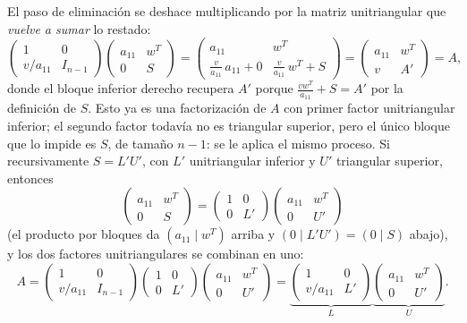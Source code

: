 \documentclass[11pt, a4paper]{article}
\begin{document}
El paso de eliminación se deshace multiplicando por la matriz unitriangular que \emph{vuelve a sumar} lo restado:
\[
\begin{pmatrix} 1 & 0 \\ v / a_{11} & I_{n-1} \end{pmatrix}
\begin{pmatrix} a_{11} & w^T \\ 0 & S \end{pmatrix}
= \begin{pmatrix} a_{11} & w^T \\[2pt] \frac{v}{a_{11}} \, a_{11} + 0 & \frac{v}{a_{11}} \, w^T + S \end{pmatrix}
= \begin{pmatrix} a_{11} & w^T \\ v & A' \end{pmatrix} = A,
\]
donde el bloque inferior derecho recupera $A'$ porque $\frac{v w^T}{a_{11}} + S = A'$ por la definición de $S$. Esto ya es una factorización de $A$ con primer factor unitriangular inferior; el segundo factor todavía no es triangular superior, pero el único bloque que lo impide es $S$, de tamaño $n - 1$: se le aplica el mismo proceso. Si recursivamente $S = L' U'$, con $L'$ unitriangular inferior y $U'$ triangular superior, entonces
\[
\begin{pmatrix} a_{11} & w^T \\ 0 & S \end{pmatrix}
= \begin{pmatrix} 1 & 0 \\ 0 & L' \end{pmatrix}
\begin{pmatrix} a_{11} & w^T \\ 0 & U' \end{pmatrix}
\]
(el producto por bloques da $(a_{11} \mid w^T)$ arriba y $(0 \mid L'U') = (0 \mid S)$ abajo), y los dos factores unitriangulares se combinan en uno:
\[
A = \begin{pmatrix} 1 & 0 \\ v/a_{11} & I_{n-1} \end{pmatrix}
\begin{pmatrix} 1 & 0 \\ 0 & L' \end{pmatrix}
\begin{pmatrix} a_{11} & w^T \\ 0 & U' \end{pmatrix}
= \underbrace{\begin{pmatrix} 1 & 0 \\ v/a_{11} & L' \end{pmatrix}}_{L}
\underbrace{\begin{pmatrix} a_{11} & w^T \\ 0 & U' \end{pmatrix}}_{U}.
\]
\end{document}
